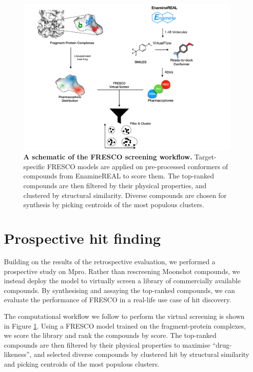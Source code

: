 \begin{figure}[!h]
 \centering
 \includegraphics[width=\linewidth]{Chapters/Fresco/Figs/flowchart_screening.pdf}
 \caption{\textbf{A schematic of the FRESCO screening workflow.} Target-specific FRESCO models are applied on pre-processed conformers of compounds from EnamineREAL to score them. The top-ranked compounds are then filtered by their physical properties, and clustered by structural similarity. Diverse compounds are chosen for synthesis by picking centroids of the most populous clusters.}
 \label{fig:screening_workflow}
\end{figure}

\section{Prospective hit finding} \label{sec:prospective}

Building on the results of the retrospective evaluation, we performed a prospective study on Mpro. Rather than rescreening Moonshot compounds, we instead deploy the model to virtually screen a library of commercially available compounds. By synthesising and assaying the top-ranked compounds, we can evaluate the performance of FRESCO in a real-life use case of hit discovery.

The computational workflow we follow to perform the virtual screening is shown in Figure \ref{fig:screening_workflow}. Using a FRESCO model trained on the fragment-protein complexes, we score the library and rank the compounds by score. The top-ranked compounds are then filtered by their physical properties to maximise ``drug-likeness'', and selected diverse compounds by clustered hit by structural similarity and picking centroids of the most populous clusters.

